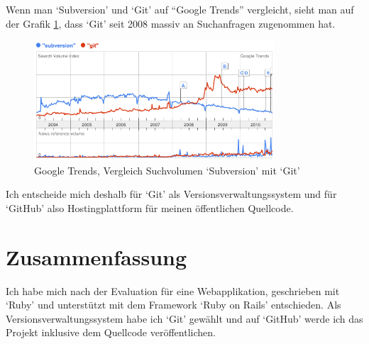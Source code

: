 Wenn man `Subversion' und `Git' auf ``Google Trends'' vergleicht, sieht man auf
der Grafik \ref{svn_vs_git}, dass `Git' seit 2008 massiv an Suchanfragen zugenommen
hat.

\begin{figure}[ht]
    \begin{center}
        \includegraphics[width=0.8\textwidth,angle=0]{./bilder/svn_vs_git.png}
        \caption{Google Trends, Vergleich Suchvolumen `Subversion' mit `Git'}
        \label{svn_vs_git}
    \end{center}
\end{figure}

Ich entscheide mich deshalb für `Git' als Versionsverwaltungssystem und für `GitHub'
also Hostingplattform für meinen öffentlichen Quellcode.

\section{Zusammenfassung}
Ich habe mich nach der Evaluation für eine Webapplikation, geschrieben mit `Ruby'
und unterstützt mit dem Framework `Ruby on Rails' entschieden. Als Versionsverwaltungssystem
habe ich `Git' gewählt und auf `GitHub' werde ich das Projekt inklusive dem Quellcode
veröffentlichen.